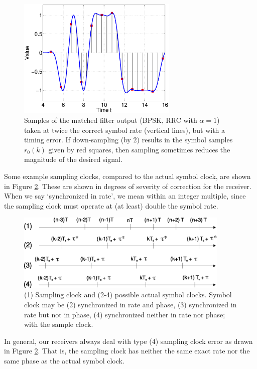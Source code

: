 \begin{figure}[htbp]
  \centerline{\includegraphics[width=3in]{../images/plotBPSK_SamplingError_0_3.eps} }
  \caption{Samples of the matched filter output (BPSK, RRC with $\alpha=1$) taken at twice the correct
  symbol rate (vertical lines), but with a timing error.  If down-sampling (by 2) results in the symbol
  samples $r_0(k)$ given by red squares, then sampling sometimes reduces the magnitude of the desired signal.}
  \label{F:BPSK_SamplingError}
\end{figure}


Some example sampling clocks, compared to the actual symbol clock,
are shown in Figure \ref{F:PossibleSamplingTimes}.  These are shown
in degrees of severity of correction for the receiver.  When we say
`synchronized in rate', we mean within an integer multiple, since
the sampling clock must operate at (at least) double the symbol
rate.

\begin{figure}[htbp]
\centerline{
  \includegraphics[width=4in]{../images/SamplingTimeCorrection.eps}}
  \caption{(1) Sampling clock and (2-4) possible actual symbol clocks.  Symbol clock
  may be (2) synchronized in rate and phase, (3) synchronized in rate but not in
  phase,
  (4) synchronized neither in rate nor phase; with the sample clock. }
  \label{F:PossibleSamplingTimes}
\end{figure}

In general, our receivers always deal with type (4) sampling clock
error as drawn in Figure \ref{F:PossibleSamplingTimes}.  That is,
the sampling clock has  neither the same exact rate nor the same
phase as the actual symbol clock.


